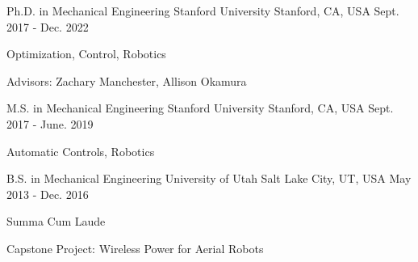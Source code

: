 

\begin{cventries}

  \cventry
    {Ph.D. in Mechanical Engineering} %
    {Stanford University} %
    {Stanford, CA, USA} %
    {Sept. 2017 - Dec. 2022} %
    {
      \begin{cvitems} %
        \item {Optimization, Control, Robotics}
        \item {Advisors: Zachary Manchester, Allison Okamura}
      \end{cvitems}
    }
    
  \cventry
    {M.S. in Mechanical Engineering} %
    {Stanford University} %
    {Stanford, CA, USA} %
    {Sept. 2017 - June. 2019} %
    {
      \begin{cvitems} %
        \item {Automatic Controls, Robotics}
      \end{cvitems}
    }
    
  \cventry
    {B.S. in Mechanical Engineering} %
    {University of Utah} %
    {Salt Lake City, UT, USA} %
    {May 2013 - Dec. 2016} %
    {
      \begin{cvitems} %
        \item {Summa Cum Laude}
        \item {Capstone Project: Wireless Power for Aerial Robots}
      \end{cvitems}
    }

\end{cventries}
